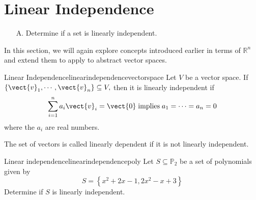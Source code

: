 \section{Linear Independence}

\begin{outcome}
\begin{enumerate}
\item[A.] Determine if a set is linearly independent.
\end{enumerate}
\end{outcome}

In this section, we will again explore concepts introduced earlier in terms of $\mathbb{R}^n$ and extend them to apply to abstract vector spaces. 

\begin{definition}{Linear Independence}{linearindependencevectorspace}
Let $V$ be a vector space. If $\{\vect{v}_{1},\cdots ,\vect{v}_{n}\} \subseteq V,$ then it is linearly independent
 if
\begin{equation*}
\sum_{i=1}^{n}a_{i}\vect{v}_{i}=\vect{0} \;\mbox{implies}\;
a_{1}=\cdots =a_{n}=0
\end{equation*}
where the $a_i$ are real numbers. 
\end{definition}

The
set of vectors is called linearly dependent if it is not linearly independent.

\begin{example}{Linear independence}{linearindependencepoly}
Let $S \subseteq \mathbb{P}_2$ be a set of polynomials given by
\[
S = \left\{ x^2 + 2x - 1, 2x^2 - x + 3 \right\}
\]
Determine if $S$ is linearly independent. 
\end{example}

